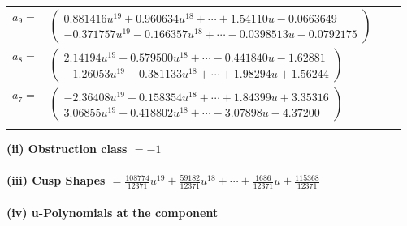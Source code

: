 \documentclass[1p]{elsarticle_modified}
\theoremstyle{definition}
\begin{document}
\begin{tabular}{m{7pt} m{180pt} m{7pt} m{180pt} }
\flushright $a_{9}=$&$\begin{pmatrix}0.881416 u^{19}+0.960634 u^{18}+\cdots+1.54110 u-0.0663649\\-0.371757 u^{19}-0.166357 u^{18}+\cdots-0.0398513 u-0.0792175\end{pmatrix}$ \\
\flushright $a_{8}=$&$\begin{pmatrix}2.14194 u^{19}+0.579500 u^{18}+\cdots-0.441840 u-1.62881\\-1.26053 u^{19}+0.381133 u^{18}+\cdots+1.98294 u+1.56244\end{pmatrix}$ \\
\flushright $a_{7}=$&$\begin{pmatrix}-2.36408 u^{19}-0.158354 u^{18}+\cdots+1.84399 u+3.35316\\3.06855 u^{19}+0.418802 u^{18}+\cdots-3.07898 u-4.37200\end{pmatrix}$\\&\end{tabular}
\flushleft \textbf{(ii) Obstruction class $= -1$}\\~\\
\flushleft \textbf{(iii) Cusp Shapes $= \frac{108774}{12371} u^{19}+\frac{59182}{12371} u^{18}+\cdots+\frac{1686}{12371} u+\frac{115368}{12371}$}\\~\\
\newpage\renewcommand{\arraystretch}{1}
\flushleft \textbf{(iv) u-Polynomials at the component}\newline \\
\end{document}
